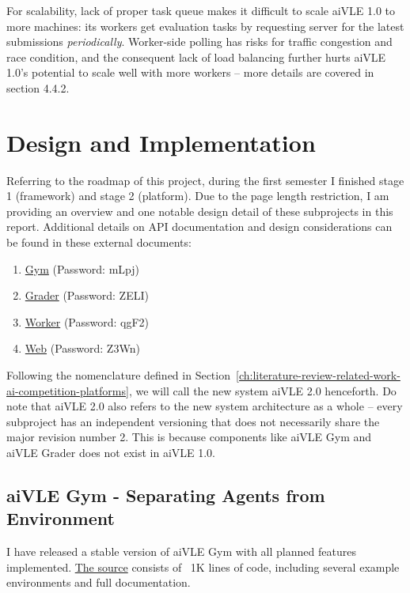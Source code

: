 \documentclass[fyp]{socreport}
\begin{document}
For scalability, lack of proper task queue makes it difficult to scale aiVLE 1.0 to more machines: its workers get evaluation tasks by requesting server for the latest submissions \textit{periodically}. Worker-side polling has risks for traffic congestion and race condition, and the consequent lack of load balancing further hurts aiVLE 1.0’s potential to scale well with more workers – more details are covered in section 4.4.2.


\chapter{Design and Implementation}
\label{ch:design-and-impl}
Referring to the roadmap of this project, during the first semester I finished stage 1 (framework) and stage 2 (platform). Due to the page length restriction, I am providing an overview and one notable design detail of these subprojects in this report. Additional details on API documentation and design considerations can be found in these external documents:
\begin{enumerate}
    \item \href{https://yuanhong.larksuite.com/docs/docusSYdnLXZBojin39b8DGzKMT}{Gym} (Password: mLpj)
    \item \href{https://yuanhong.larksuite.com/docs/docuseeHRJWAMV3p3uL7yYCOeYx}{Grader} (Password: ZELI)
    \item \href{https://yuanhong.larksuite.com/docs/docussD8ik4yBXShA5kPyRGhgdg}{Worker} (Password: qgF2)
    \item \href{https://yuanhong.larksuite.com/docs/docusfWZk1oYG8qkEMG7y2oxkye}{Web} (Password: Z3Wn)
\end{enumerate}

Following the nomenclature defined in Section~\ref{ch:literature-review-related-work-ai-competition-platforms}, we will call the new system aiVLE 2.0 henceforth. Do note that aiVLE 2.0 also refers to the new system architecture as a whole – every subproject has an independent versioning that does not necessarily share the major revision number 2. This is because components like aiVLE Gym and aiVLE Grader does not exist in aiVLE 1.0.

\section{aiVLE Gym - Separating Agents from Environment}
\label{ch:aivle-gym}
I have released a stable version of aiVLE Gym with all planned features implemented. \href{https://github.com/edu-ai/aivle-gym}{The source} consists of ~1K lines of code, including several example environments and full documentation.
\end{document}
